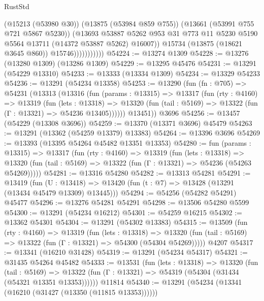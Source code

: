 \begin{lexlean}{RustStd}
\begin{coremodule}
                            (@15213 (@53980 @30))
                            (@13875 (@53984 @859 @755))
                            (@13661 (@53991 @755 @721 @5867 @5230))
                            (@13693
                              @53887
                              @5262
                              @953
                              @31
                              @773
                              @11
                              @5230
                              @5190
                              @5564
                              @13711
                              (@14372 @53887 @5262)
                              @16007))
                          @15734
                          (@13875 (@18621 @3645 @860))
                          @15746)))))))))))
@54224 := @13274 @1309
@54228 := @13276 (@13280 @1309) (@13286 @1309)
@54229 := @13295 @45476
@54231 := @13291 (@54229 @13310)
@54233 := @13333 (@13334 @1309)
@54234 := @13329 @54233
@54236 := @13291 (@54234 @13358)
@54253 := @13290
    (fun (fn : @705) =>
    @54231
      (@13313
        (@13316
          (fun (params : @13315) =>
          @13317
            (fun (rty : @4160) =>
            @13319
              (fun (lets : @13318) =>
              @13320 (fun (tail : @5169) => @13322 (fun (Γ : @13321) => @54236 @13405))))))
        @13451))
    @3696
@54256 := @13457 (@54229 (@13308 @3696))
@54259 := @13370 (@13371 @3696) @45479
@54263 := @13291 (@13362 (@54259 @13379) @13383)
@54264 := @13396 @3696
@54269 := @13393 (@13395 @54264 @45482 @13351 @13353)
@54280 := fun (params : @13315) =>
  @13317
    (fun (rty : @4160) =>
    @13319
      (fun (lets : @13318) =>
      @13320 (fun (tail : @5169) => @13322 (fun (Γ : @13321) => @54236 (@54263 @54269)))))
@54281 := @13316 @54280
@54282 := @13313 @54281
@54291 := @13419
    (fun (U : @13418) => @13420 (fun (t : @7) => @13428 (@13291 (@13434 @45479 @13309) @13445)))
@54294 := @54256 (@54282 @54291) @45477
@54296 := @13276 @54281 @54291
@54298 := @13506 @54280 @5599
@54300 := @13291 (@54234 @16212)
@54301 := @54259 @16215
@54302 := @13362 @54301
@54304 := @13291 (@54302 @13383)
@54315 := @13509
    (fun (rty : @4160) =>
    @13319
      (fun (lets : @13318) =>
      @13320 (fun (tail : @5169) => @13322 (fun (Γ : @13321) => @54300 (@54304 @54269)))))
    @4207
@54317 := @13341 (@16210 @31428)
@54319 := @13291 (@54234 @54317)
@54321 := @31435 @54264 @45482
@54333 := @13531
    (fun (lets : @13318) =>
    @13320
      (fun (tail : @5169) =>
      @13322 (fun (Γ : @13321) => @54319 (@54304 (@31434 (@54321 @13351 @13353))))))
    @11814
@54340 := @13291 (@54234 (@13341 (@16210 (@31427 (@13350 (@11815 @13353))))))

\end{coremodule}
\end{lexlean}

